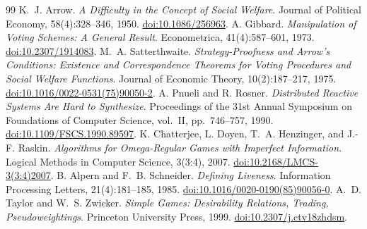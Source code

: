 \documentclass[11pt,letterpaper]{article}
\theoremstyle{plain}
\theoremstyle{definition}
\theoremstyle{remark}
\begin{document}
\begin{thebibliography}{99}
 K.~J. Arrow. \emph{A Difficulty in the Concept of Social Welfare}. Journal of Political Economy, 58(4):328--346, 1950. \href{https://doi.org/10.1086/256963}{doi:10.1086/256963}.
 A. Gibbard. \emph{Manipulation of Voting Schemes: A General Result}. Econometrica, 41(4):587--601, 1973. \href{https://doi.org/10.2307/1914083}{doi:10.2307/1914083}.
 M.~A. Satterthwaite. \emph{Strategy-Proofness and Arrow's Conditions: Existence and Correspondence Theorems for Voting Procedures and Social Welfare Functions}. Journal of Economic Theory, 10(2):187--217, 1975. \href{https://doi.org/10.1016/0022-0531(75)90050-2}{doi:10.1016/0022-0531(75)90050-2}.
 A. Pnueli and R. Rosner. \emph{Distributed Reactive Systems Are Hard to Synthesize}. Proceedings of the 31st Annual Symposium on Foundations of Computer Science, vol.~II, pp.~746--757, 1990. \href{https://doi.org/10.1109/FSCS.1990.89597}{doi:10.1109/FSCS.1990.89597}.
 K. Chatterjee, L. Doyen, T.~A. Henzinger, and J.-F. Raskin. \emph{Algorithms for Omega-Regular Games with Imperfect Information}. Logical Methods in Computer Science, 3(3:4), 2007. \href{https://doi.org/10.2168/LMCS-3(3:4)2007}{doi:10.2168/LMCS-3(3:4)2007}.
 B. Alpern and F.~B. Schneider. \emph{Defining Liveness}. Information Processing Letters, 21(4):181--185, 1985. \href{https://doi.org/10.1016/0020-0190(85)90056-0}{doi:10.1016/0020-0190(85)90056-0}.
 A.~D. Taylor and W.~S. Zwicker. \emph{Simple Games: Desirability Relations, Trading, Pseudoweightings}. Princeton University Press, 1999. \href{https://doi.org/10.2307/j.ctv18zhdsm}{doi:10.2307/j.ctv18zhdsm}.


\end{thebibliography}
\end{document}
